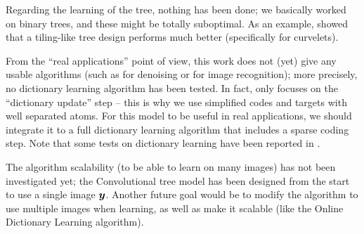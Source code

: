 \noindent
Regarding the learning of the tree, nothing has been done; we basically worked on binary trees, and these might be totally suboptimal. As an example, \cite{chabiron_optimization_2016} showed that a tiling-like tree design performs much better (specifically for curvelets).

From the “real applications” point of view, this work does not (yet) give any usable algorithms (such as for denoising or for image recognition); more precisely, no dictionary learning algorithm has been tested. In fact, only focuses on the “dictionary update” step – this is why we use simplified codes and targets with well separated atoms. For this model to be useful in real applications, we should integrate it to a full dictionary learning algorithm that includes a sparse coding step. Note that some tests on dictionary learning have been reported in \cite{chabiron_optimization_2016}. 

\noindent
The algorithm scalability (to be able to learn on many images) has not been investigated yet; the Convolutional tree model has been designed from the start to use a single image $\bm{y}$. Another future goal would be to modify the algorithm to use multiple images when learning, as well as make it scalable (like the Online Dictionary Learning algorithm).



\clearpage
{}
\appendix

\chapter{}

